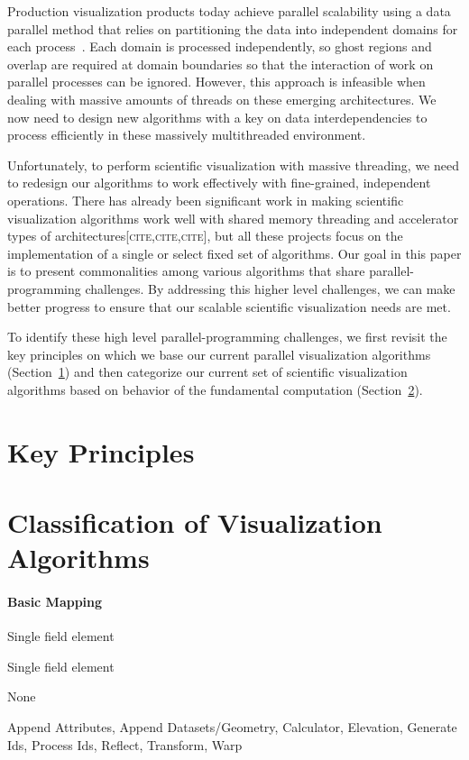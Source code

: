 \documentclass{sig-alternate}
\newcommand*{\lcite}[1]{~\cite{#1}}
\newcommand{\fix}[1]{{\color{red}\textsc{[#1]}}}
\newcommand{\algorithmclasssection}[1]{\paragraph{#1}}
\newcommand{\algorithmclass}[5]{
  \algorithmclasssection{#1} %
  \begin{description}[leftmargin=4.5em,style=nextline,noitemsep]
  \item[Input] #2
  \item[Output] #3
  \item[Overlap] #4
  \item[Algorithms] #5
  \end{description}
}
\begin{document}
Production visualization products today achieve parallel scalability using
a data parallel method that relies on partitioning the data into
independent domains for each process\lcite{Ahrens2001}. Each domain is
processed independently, so ghost regions and overlap are required at
domain boundaries so that the interaction of work on parallel processes can
be ignored. However, this approach is infeasible when dealing with massive
amounts of threads on these emerging architectures. We now need to design
new algorithms with a key on data interdependencies to process efficiently
in these massively multithreaded environment.

Unfortunately, to perform scientific visualization with massive threading,
we need to redesign our algorithms to work effectively with fine-grained,
independent operations. There has already been significant work in making
scientific visualization algorithms work well with shared memory threading
and accelerator types of architectures\fix{cite,cite,cite}, but all these
projects focus on the implementation of a single or select fixed set of
algorithms. Our goal in this paper is to present commonalities among
various algorithms that share parallel-programming challenges. By
addressing this higher level challenges, we can make better progress to
ensure that our scalable scientific visualization needs are met.

To identify these high level parallel-programming challenges, we first
revisit the key principles on which we base our current parallel
visualization algorithms (Section~\ref{sec:KeyPrinciples}) and then
categorize our current set of scientific visualization algorithms based on
behavior of the fundamental computation
(Section~\ref{sec:Classification}).


\section{Key Principles}
\label{sec:KeyPrinciples}


\section{Classification of Visualization Algorithms}
\label{sec:Classification}


\algorithmclass{Basic Mapping}
               {Single field element} %
               {Single field element} %
               {None} %
               {Append Attributes, Append Datasets/Geometry, Calculator,
                 Elevation, Generate Ids, Process Ids, Reflect, Transform,
                 Warp}
\end{document}
